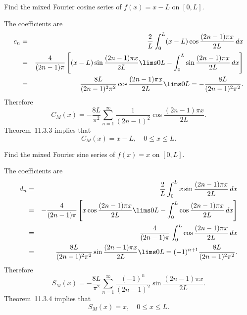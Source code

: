 \setcounter{example}{2}
\begin{example}
  \label{example:11.3.3} \rm Find the mixed Fourier cosine series of $f(x)=x-L$ on $[0,L]$.
\end{example}
\begin{examplesolution}
\solution The coefficients are
\begin{eqnarray*}
  c_{n} & = & \frac{2}{L}\int_{0}^{L}(x-L)\cos\frac{(2n-1)\pi x}{2L}\,dx                                                        \\
        & = & \frac{4}{(2n-1)\pi}\left[(x-L)\sin\frac{(2n-1)\pi x}{2L}\lims0L-\int_{0}^{L}\sin\frac{(2n-1)\pi x}{2L}\,dx\right] \\
        & = & \frac{8L}{(2n-1)^{2}\pi^{2}}\cos\frac{(2n-1)\pi x}{2L}\lims0L=-\frac{8L}{(2n-1)^{2}\pi^{2}}.
\end{eqnarray*}
Therefore
\[
  C_{M}(x)=-\frac{8L}{\pi^{2}}\sum_{n=1}^{\infty}\frac{1}{(2n-1)^{2}}\cos\frac{(2n-1)\pi x}{2L}.
\]
Theorem~11.3.3 implies that
\[
  C_{M}(x)=x-L,\quad0\le x\le L.
\]
\end{examplesolution}

\setcounter{example}{3}
\begin{example}
  \label{example:11.3.4} \rm Find the mixed Fourier sine series of $f(x)=x$ on $[0,L]$.
\end{example}
\begin{examplesolution}
\solution The coefficients are
\begin{eqnarray*}
  d_{n} & = & \frac{2}{L}\int_{0}^{L}x\sin\frac{(2n-1)\pi x}{2L}\,dx                                                         \\
        & = & -\frac{4}{(2n-1)\pi}\left[x\cos\frac{(2n-1)\pi x}{2L}\lims0L-\int_{0}^{L}\cos\frac{(2n-1)\pi x}{2L}\,dx\right] \\
        & = & \frac{4}{(2n-1)\pi}\int_{0}^{L}\cos\frac{(2n-1)\pi x}{2L}\,dx                                                  \\
        & = & \frac{8L}{(2n-1)^{2}\pi^{2}}\sin\frac{(2n-1)\pi x}{2L}\lims0L=(-1)^{n+1}\frac{8L}{(2n-1)^{2}\pi^{2}}.
\end{eqnarray*}
Therefore
\[
  S_{M}(x)=-\frac{8L}{\pi^{2}}\sum_{n=1}^{\infty}\frac{(-1)^{n}}{(2n-1)^{2}}\sin\frac{(2n-1)\pi x}{2L}.
\]
Theorem~11.3.4 implies that
\[
  S_{M}(x)=x,\quad0\le x\le L.
\]
\end{examplesolution}

